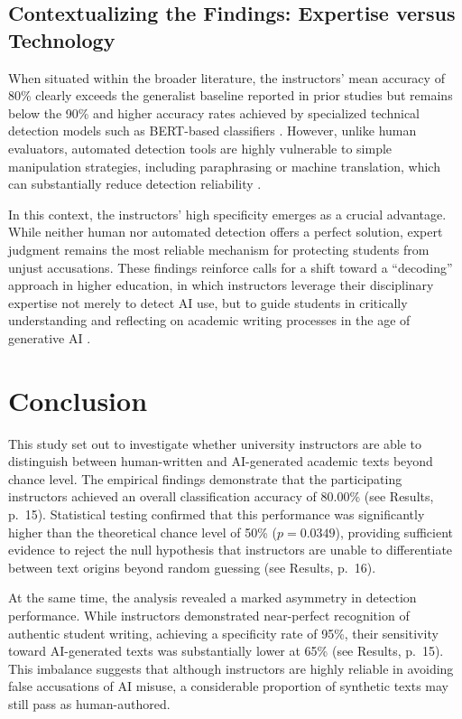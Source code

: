 \documentclass[12pt]{article}
\begin{document}
\subsection{Contextualizing the Findings: Expertise versus Technology}

When situated within the broader literature, the instructors’ mean accuracy of 80\% clearly exceeds the generalist baseline reported in prior studies but remains below the 90\% and higher accuracy rates achieved by specialized technical detection models such as BERT-based classifiers \autocite[6]{walker_text_2024}. However, unlike human evaluators, automated detection tools are highly vulnerable to simple manipulation strategies, including paraphrasing or machine translation, which can substantially reduce detection reliability \autocite[2]{chaka_detecting_2023}.

In this context, the instructors’ high specificity emerges as a crucial advantage. While neither human nor automated detection offers a perfect solution, expert judgment remains the most reliable mechanism for protecting students from unjust accusations. These findings reinforce calls for a shift toward a ``decoding'' approach in higher education, in which instructors leverage their disciplinary expertise not merely to detect AI use, but to guide students in critically understanding and reflecting on academic writing processes in the age of generative AI \autocites[4]{rahimi_ai_2025}[96]{kumar_ai_2025}.

\newpage
\section{Conclusion}

This study set out to investigate whether university instructors are able to distinguish between human-written and AI-generated academic texts beyond chance level. The empirical findings demonstrate that the participating instructors achieved an overall classification accuracy of 80.00\% (see Results, p.~15). Statistical testing confirmed that this performance was significantly higher than the theoretical chance level of 50\% ($p = 0.0349$), providing sufficient evidence to reject the null hypothesis that instructors are unable to differentiate between text origins beyond random guessing (see Results, p.~16).

At the same time, the analysis revealed a marked asymmetry in detection performance. While instructors demonstrated near-perfect recognition of authentic student writing, achieving a specificity rate of 95\%, their sensitivity toward AI-generated texts was substantially lower at 65\% (see Results, p.~15). This imbalance suggests that although instructors are highly reliable in avoiding false accusations of AI misuse, a considerable proportion of synthetic texts may still pass as human-authored.
\end{document}
